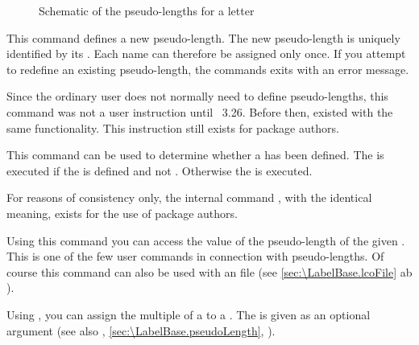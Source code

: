 \begin{figure}
  \centering
  \tikzset{x=.56mm,y=-.56mm}
  \tiny
  
  \caption{Schematic of the pseudo-lengths for a letter}
  \label{fig:\LabelBase.pseudoLength}
\end{figure}


\begin{Declaration}
\end{Declaration}
This command
defines a new pseudo-length. The new pseudo-length is uniquely identified by
its . Each name can therefore be assigned only once. If you
attempt to redefine an existing pseudo-length, the commands exits with an
error message.

%
Since the ordinary user does not normally need to define pseudo-lengths, this
command was not a user instruction until \KOMAScript~3.26. Before then,
 existed with the same functionality. This instruction still
exists for package authors.%
\EndIndexGroup


\begin{Declaration}
\end{Declaration}
This command can be
used to determine whether a  has been defined. The
 is executed if the  is defined and not
. Otherwise the  is executed.

%
For reasons of consistency only, the internal command ,
with the identical meaning, exists for the use of package authors.%
\EndIndexGroup


\begin{Declaration}
\end{Declaration}
Using this command you can access the value of the pseudo-length of
the given . This is one of the few user commands in
connection with pseudo-lengths. Of course this command can also be
used with an  file (see
\autoref{sec:\LabelBase.lcoFile} ab ).%
%
\EndIndexGroup


\begin{Declaration}
\end{Declaration}
Using , you can assign the multiple of a
 to a . The  is given as an
optional argument (see also ,
\autoref{sec:\LabelBase.pseudoLength},
).

